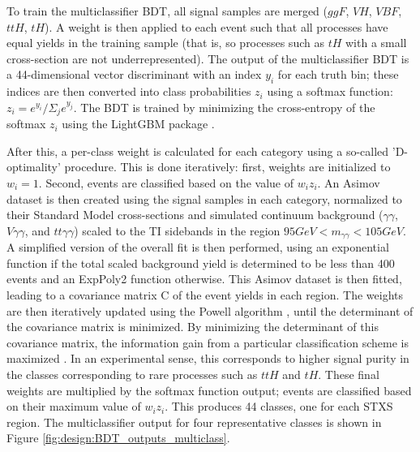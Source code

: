 To train the multiclassifier BDT, all signal samples are merged ($ggF$, $VH$, $VBF$, $ttH$, $tH$). A weight is then applied to each event such that all processes have equal yields in the training sample (that is, so processes such as $tH$ with a small cross-section are not underrepresented). The output of the multiclassifier BDT is a 44-dimensional vector discriminant with an index $y_{i}$ for each truth bin; these indices are then converted into class probabilities $z_{i}$ using a softmax function: $z_{i} = e^{y_{i}}/{\Sigma_{j}e^{y_{j}}}$. The BDT is trained by minimizing the cross-entropy of the softmax $z_{i}$ using the LightGBM package \cite{LightGBM}.

After this, a per-class weight is calculated for each category using a so-called 'D-optimality' procedure. This is done iteratively: first, weights are initialized to $w_{i} = 1$. Second, events are classified based on the value of $w_{i}z_{i}$. An Asimov dataset \cite{Cowan} is then created using the signal samples in each category, normalized to their Standard Model cross-sections and simulated continuum background ($\gamma\gamma$, $V\gamma\gamma$, and $tt\gamma\gamma$) scaled to the TI sidebands in the region $95 GeV < m_{\gamma \gamma} < 105 GeV$. A simplified version of the overall fit is then performed, using an exponential function if the total scaled background yield is determined to be less than 400 events and an ExpPoly2 function otherwise. This Asimov dataset is then fitted, leading to a covariance matrix C of the event yields in each region. The weights are then iteratively updated using the Powell algorithm \cite{Powell}, until the determinant of the covariance matrix is minimized. By minimizing the determinant of this covariance matrix, the information gain from a particular classification scheme is maximized \cite{Lindley}. In an experimental sense, this corresponds to higher signal purity in the classes corresponding to rare processes such as $ttH$ and $tH$. These final weights are multiplied by the softmax function output; events are classified based on their maximum value of $w_{i}z_{i}$. This produces 44 classes, one for each STXS region. The multiclassifier output for four representative classes is shown in Figure \ref{fig:design:BDT_outputs_multiclass}.


